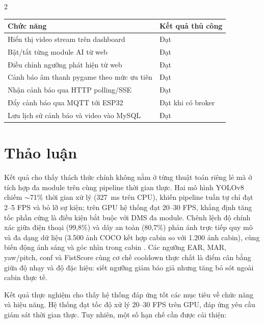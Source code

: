 \documentclass[10pt]{article}
\begin{document}
\begin{multicols}{2}
\noindent
\begin{minipage}{\columnwidth}
\centering
{}
\label{tab:functional}
\fontsize{7}{8.5}\selectfont
\setlength{\tabcolsep}{2.5pt}
\begin{tabular}{ll}
\toprule
Chức năng & Kết quả thủ công \\
\midrule
Hiển thị video stream trên dashboard & Đạt \\
Bật/tắt từng module AI từ web & Đạt \\
Điều chỉnh ngưỡng phát hiện từ web & Đạt \\
Cảnh báo âm thanh pygame theo mức ưu tiên & Đạt \\
Nhận cảnh báo qua HTTP polling/SSE & Đạt \\
Đẩy cảnh báo qua MQTT tới ESP32 & Đạt khi có broker \\
Lưu lịch sử cảnh báo và video vào MySQL & Đạt \\
\bottomrule
\end{tabular}
\end{minipage}
\vspace{4pt}

\section{Thảo luận}

\begin{sloppypar}
Kết quả cho thấy thách thức chính không nằm ở từng thuật toán riêng lẻ mà ở tích hợp đa module trên cùng pipeline thời gian thực. Hai mô hình YOLOv8 chiếm $\sim$71\% thời gian xử lý (327~ms trên CPU), khiến pipeline tuần tự chỉ đạt 2--5 FPS và bỏ lỡ sự kiện; trên GPU hệ thống đạt 20--30 FPS, khẳng định tăng tốc phần cứng là điều kiện bắt buộc với DMS đa module. Chênh lệch độ chính xác giữa điện thoại (99,8\%) và dây an toàn (80,7\%) phản ánh trực tiếp quy mô và đa dạng dữ liệu (3.500 ảnh COCO kết hợp cabin so với 1.200 ảnh cabin), cùng biến động ánh sáng và góc nhìn trong cabin \cite{voulodimos2018, lecun2015}. Các ngưỡng EAR, MAR, yaw/pitch, conf và FistScore cùng cơ chế cooldown thực chất là điểm cân bằng giữa độ nhạy và độ đặc hiệu: siết ngưỡng giảm báo giả nhưng tăng bỏ sót ngoài cabin thực tế.
\end{sloppypar}

Kết quả thực nghiệm cho thấy hệ thống đáp ứng tốt các mục tiêu về chức năng và hiệu năng. Hệ thống đạt tốc độ xử lý 20--30 FPS trên GPU, đáp ứng yêu cầu giám sát thời gian thực. Tuy nhiên, một số hạn chế cần được cải thiện:


\end{multicols}
\end{document}
